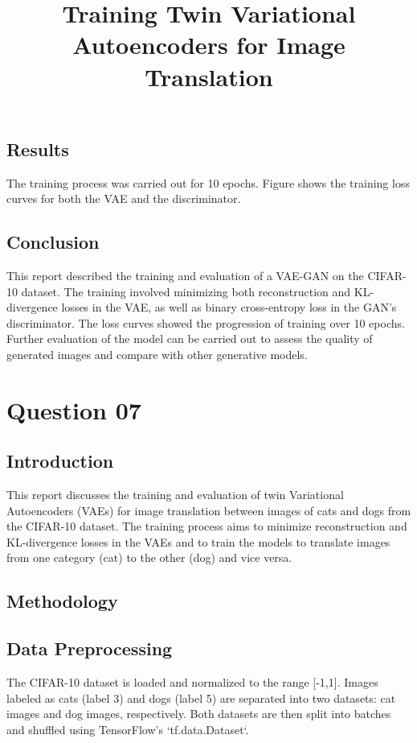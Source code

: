 \documentclass{article}
\begin{document}
\subsection{Results}
The training process was carried out for 10 epochs. Figure shows the training loss curves for both the VAE and the discriminator.


\subsection{Conclusion}
This report described the training and evaluation of a VAE-GAN on the CIFAR-10 dataset. The training involved minimizing both reconstruction and KL-divergence losses in the VAE, as well as binary cross-entropy loss in the GAN's discriminator. The loss curves showed the progression of training over 10 epochs. Further evaluation of the model can be carried out to assess the quality of generated images and compare with other generative models.



\section{Question 07}
\title{Training Twin Variational Autoencoders for Image Translation}


\subsection{Introduction}
This report discusses the training and evaluation of twin Variational Autoencoders (VAEs) for image translation between images of cats and dogs from the CIFAR-10 dataset. The training process aims to minimize reconstruction and KL-divergence losses in the VAEs and to train the models to translate images from one category (cat) to the other (dog) and vice versa.

\subsection{Methodology}

\subsection{Data Preprocessing}
The CIFAR-10 dataset is loaded and normalized to the range [-1,1]. Images labeled as cats (label 3) and dogs (label 5) are separated into two datasets: cat images and dog images, respectively. Both datasets are then split into batches and shuffled using TensorFlow's `tf.data.Dataset`.
\end{document}
